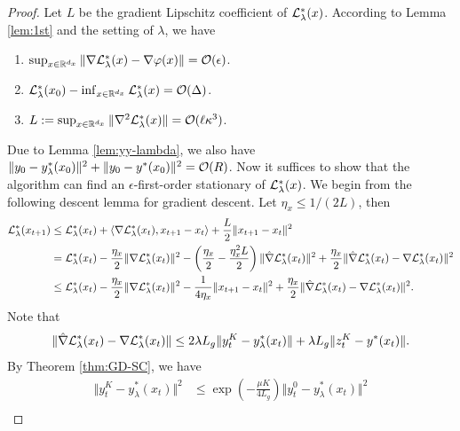 \thmFBA* 
\begin{proof}
Let $L$ be the gradient Lipschitz coefficient of ${\mathcal{L}}_{\lambda}^*(x)$.
According to Lemma \ref{lem:1st} and the setting of $\lambda$, we have
\begin{enumerate}[label=\alph*.]
    \item $\sup_{x \in {\mathbb{R}}^{d_x}} \Vert \nabla {\mathcal{L}}_{\lambda}^*(x) - \nabla \varphi(x) \Vert = {\mathcal{O}}(\epsilon)$. 
    \item ${\mathcal{L}}_{\lambda}^*(x_0) - \inf_{x \in {\mathbb{R}}^{d_x}}  {\mathcal{L}}_{\lambda}^*(x) = {\mathcal{O}}(\Delta)$.
    \item $ L:=\sup_{x \in {\mathbb{R}}^{d_x}}\Vert \nabla^2 {\mathcal{L}}_{\lambda}^*(x) \Vert = {\mathcal{O}}(\ell \kappa^3)$.
\end{enumerate}
Due to Lemma \ref{lem:yy-lambda}, we also have $ \Vert y_0 - y_{\lambda}^*(x_0) \Vert^2 + \Vert y_0 - y^*(x_0) \Vert^2 ={\mathcal{O}}(R)$.
Now it suffices to show that the algorithm can find an $\epsilon$-first-order stationary of ${\mathcal{L}}_{\lambda}^*(x)$. 
We begin from the following descent lemma for gradient descent. Let $\eta_x \le 1/(2L)$, then
\begin{align} \label{eq:des}
\begin{split}
     {\mathcal{L}}_{\lambda}^*(x_{t+1})
    &\le {\mathcal{L}}_{\lambda}^*(x_t) + \langle \nabla {\mathcal{L}}_{\lambda}^*(x_t) , x_{t+1} - x_t
    \rangle + \frac{L}{2} \Vert x_{t+1 } - x_t \Vert^2 \\
    &= {\mathcal{L}}_{\lambda}^*(x_t) -
    \frac{\eta_x}{2} \Vert \nabla {\mathcal{L}}_{\lambda}^*(x_t) \Vert^2 -
    \left( \frac{\eta_x}{2} - \frac{\eta_x^2 L}{2} \right) \Vert \hat \nabla {\mathcal{L}}_{\lambda}^*(x_t) \Vert^2 + \frac{\eta_x}{2} \Vert \hat  \nabla {\mathcal{L}}_{\lambda}^*(x_t) - \nabla {\mathcal{L}}_{\lambda}^*(x_t) \Vert^2 \\
    &\le {\mathcal{L}}_{\lambda}^*(x_t) 
    - \frac{\eta_x}{2} \Vert \nabla {\mathcal{L}}_{\lambda}^*(x_t) \Vert^2 - 
    \frac{1}{4\eta_x} \Vert x_{t+1} - x_{t} \Vert^2
    + \frac{\eta_x}{2} \Vert  \hat \nabla {\mathcal{L}}_{\lambda}^*(x_t) - \nabla {\mathcal{L}}_{\lambda}^*(x_t) \Vert^2.
\end{split}
\end{align}
Note that
\begin{align*}
    \Vert \hat \nabla {\mathcal{L}}_{\lambda}^*(x_t) - \nabla {\mathcal{L}}_{\lambda}^*(x_t) \Vert \le 2 \lambda L_g \Vert y_{t}^K- y_{\lambda}^*(x_t) \Vert + \lambda L_g \Vert z_{t}^K - y^*(x_t) \Vert.
\end{align*}
By Theorem \ref{thm:GD-SC}, we have
\begin{align*}
    \Vert y_t^K - y_{\lambda}^*(x_t) \Vert^2 &\le \exp\left( - \frac{\mu K}{4 L_g} \right) \Vert y_t^0 - y_{\lambda}^*(x_t) \Vert^2 \\

\end{align*}
\end{proof}
